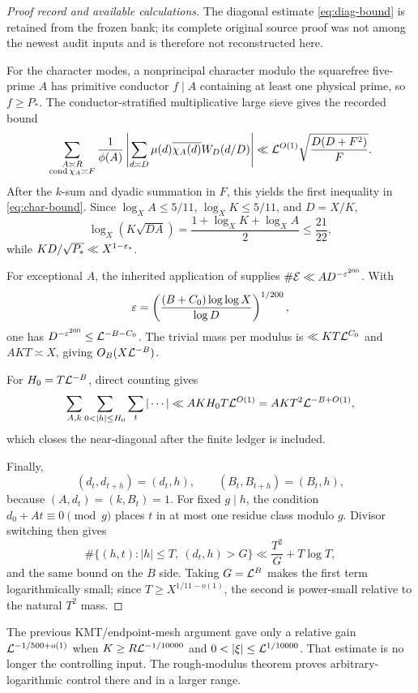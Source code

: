 \begin{proof}[Proof record and available calculations]
The diagonal estimate \cref{eq:diag-bound} is retained from the frozen bank;
its complete original source proof was not among the newest audit inputs and is
therefore not reconstructed here.

For the character modes, a nonprincipal character modulo the squarefree
five-prime $A$ has primitive conductor $f\mid A$ containing at least one
physical prime, so $f\ge P_*$.  The conductor-stratified multiplicative large
sieve gives the recorded bound
\[
 \sum_{\substack{A\asymp R\\\operatorname{cond}\chi_A\asymp F}}
 \frac1{\phi(A)}
 \left|\sum_{d\asymp D}\mu(d)\overline{\chi_A(d)}W_D(d/D)\right|
 \ll \mathcal L^{O(1)}\sqrt{\frac{D(D+F^2)}F}.
\]
After the $k$-sum and dyadic summation in $F$, this yields the first inequality
in \cref{eq:char-bound}.  Since
$\log_X A\le5/11$, $\log_XK\le5/11$, and $D=X/K$,
\[
 \log_X\!\left(K\sqrt{DA}\right)
   =\frac{1+\log_XK+\log_XA}{2}\le\frac{21}{22},
\]
while $KD/\sqrt{P_*}\ll X^{1-\varepsilon_*}$.

For exceptional $A$, the inherited application of
\cite{KMT2023} supplies
$\#\mathcal E\ll AD^{-\varepsilon^{200}}$.  With
\[
 \varepsilon=\left(\frac{(B+C_0)\log\log X}{\log D}\right)^{1/200},
\]
one has $D^{-\varepsilon^{200}}\le\mathcal L^{-B-C_0}$.  The trivial mass per modulus is
$\ll KT\mathcal L^{C_0}$ and $AKT\asymp X$, giving $O_B(X\mathcal L^{-B})$.

For $H_0=T\mathcal L^{-B}$, direct counting gives
\[
 \sum_{A,k}\sum_{0<|h|\le H_0}\sum_t|\cdots|
   \ll AKH_0T\LL^{O(1)}
   =AKT^2\LL^{-B+O(1)},
\]
which closes the near-diagonal after the finite ledger is included.

Finally,
\[
 (d_t,d_{t+h})=(d_t,h),\qquad
 (B_t,B_{t+h})=(B_t,h),
\]
because $(A,d_t)=(k,B_t)=1$.  For fixed $g\mid h$, the condition
$d_0+At\equiv0\pmod g$ places $t$ in at most one residue class modulo $g$.
Divisor switching then gives
\begin{equation}\label{eq:gcd-count}
 \#\{(h,t):|h|\le T,\ (d_t,h)>G\}
       \ll\frac{T^2}{G}+T\log T,
\end{equation}
and the same bound on the $B$ side.  Taking $G=\mathcal L^B$ makes the first term
logarithmically small; since $T\ge X^{1/11-o(1)}$, the second is power-small
relative to the natural $T^2$ mass.
\end{proof}

\begin{remark}
The previous KMT/endpoint-mesh argument gave only a relative gain
$\mathcal L^{-1/500+o(1)}$ when
$K\ge R\mathcal L^{-1/10000}$ and
$0<|\xi|\le\LL^{1/10000}$.  That estimate is no longer the controlling input.
The rough-modulus theorem proves arbitrary-logarithmic control there and in a
larger range.
\end{remark}


